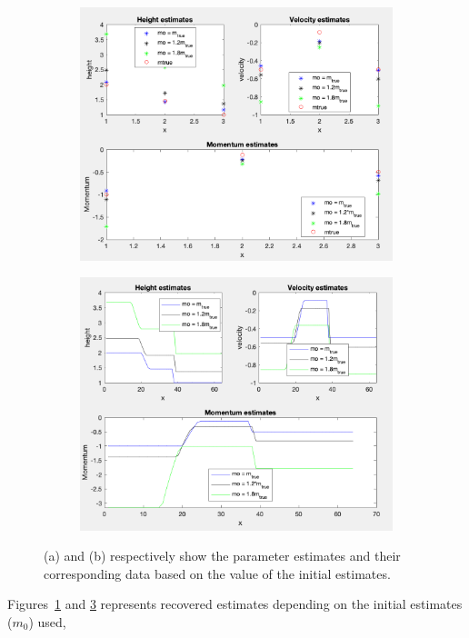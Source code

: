 \documentclass[12pt,a4paper]{article}
\begin{document}
\begin{figure}[H]
	\begin{subfigure}[b]{0.5\textwidth}
		\centering
		\includegraphics[width=1.0\linewidth]{comd}
		\caption{}
		\label{dd_mo}
	\end{subfigure}
	\begin{subfigure}[b]{0.5\textwidth}
		\centering
		\includegraphics[width=1.0\linewidth]{ccom}
		\caption{}
		\label{dat}
	\end{subfigure}
	\caption{(a) and (b) respectively show the parameter estimates and their corresponding data based on the value of the initial estimates.}
\end{figure}
Figures~\ref{dd_mo} and \ref{dat} represents recovered estimates depending on the  initial estimates ($m_0$) used, 
\end{document}
